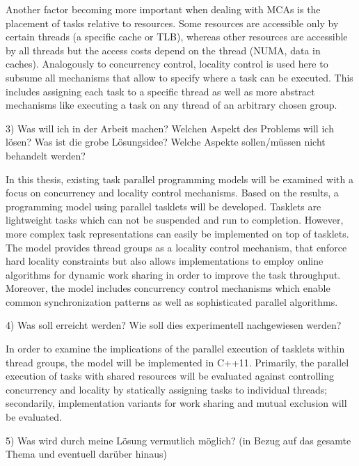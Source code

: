 \documentclass[journal]{IEEEtran}
\begin{document}
Another factor becoming more important when dealing with MCAs is the
placement of tasks relative to resources. Some resources are
accessible only by certain threads (a specific cache or TLB), whereas
other resources are accessible by all threads but the access costs
depend on the thread (NUMA, data in caches).
%
Analogously to concurrency control, locality control is used here to
subsume all mechanisms that allow to specify where a task can be
executed. This includes assigning each task to a specific thread as
well as more abstract mechanisms like executing a task on any thread
of an arbitrary chosen group.

\begin{itshape}
  3) Was will ich in der Arbeit machen?  Welchen Aspekt des Problems
  will ich lösen? Was ist die grobe Lösungsidee?  Welche Aspekte
  sollen/müssen nicht behandelt werden?
\end{itshape}

In this thesis, existing task parallel programming models will be
examined with a focus on concurrency and locality control mechanisms.
Based on the results, a programming model using parallel tasklets will
be developed.
%
Tasklets are lightweight tasks which can not be suspended and run to
completion.  However, more complex task representations can easily be
implemented on top of
tasklets.
%
The model provides thread groups as a locality control mechanism, that
enforce hard locality constraints but also allows implementations to
employ online algorithms for dynamic work sharing in order to improve
the task throughput.  Moreover, the model includes concurrency control
mechanisms which enable common synchronization patterns as well as
sophisticated parallel algorithms.

\begin{itshape}
  4) Was soll erreicht werden? Wie soll dies experimentell
  nachgewiesen werden?
\end{itshape}

In order to examine the implications of the parallel execution of
tasklets within thread groups, the model will be implemented in C++11.
Primarily, the parallel execution of tasks with shared resources will
be evaluated against controlling concurrency and locality by
statically assigning tasks to individual threads; secondarily,
implementation variants for work sharing and mutual exclusion will be
evaluated.

\begin{itshape}
  5) Was wird durch meine Lösung vermutlich möglich? (in Bezug auf das
  gesamte Thema und eventuell darüber hinaus) 
\end{itshape}
\end{document}
